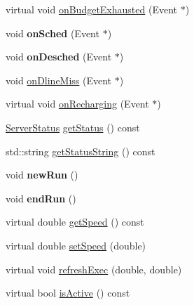 \begin{DoxyCompactItemize}
\item 
virtual void \hyperlink{classRTSim_1_1Server_aac96d1e7d21219fe4e31a49382579991}{on\+Budget\+Exhausted} (Event $\ast$)
\item 
void {\bfseries on\+Sched} (Event $\ast$)\hypertarget{classRTSim_1_1Server_a2aebdd0a2fcbbeec26896d33ad7e20fe}{}\label{classRTSim_1_1Server_a2aebdd0a2fcbbeec26896d33ad7e20fe}

\item 
void {\bfseries on\+Desched} (Event $\ast$)\hypertarget{classRTSim_1_1Server_a07abb53277721a0180be1705de77976e}{}\label{classRTSim_1_1Server_a07abb53277721a0180be1705de77976e}

\item 
void \hyperlink{classRTSim_1_1Server_aaea3cc79f262642af895aea0535a8343}{on\+Dline\+Miss} (Event $\ast$)
\item 
virtual void \hyperlink{classRTSim_1_1Server_a1953c2fe4181f52c9ef388e9dd3b477f}{on\+Recharging} (Event $\ast$)
\item 
\hyperlink{namespaceRTSim_a7b8699b4614a115fd4b5bedf6335ff7b}{Server\+Status} \hyperlink{classRTSim_1_1Server_aac5dc6ee4cc9b24aed3793d6bebcbef4}{get\+Status} () const 
\item 
std\+::string \hyperlink{classRTSim_1_1Server_a80c7082da1314a5ed5cef3cbfb6dbb10}{get\+Status\+String} () const 
\item 
void {\bfseries new\+Run} ()\hypertarget{classRTSim_1_1Server_ab5eee097079585c9f11bf3d11bbf5755}{}\label{classRTSim_1_1Server_ab5eee097079585c9f11bf3d11bbf5755}

\item 
void {\bfseries end\+Run} ()\hypertarget{classRTSim_1_1Server_ad85b3f1a41345e07a8bdf3523f7d214b}{}\label{classRTSim_1_1Server_ad85b3f1a41345e07a8bdf3523f7d214b}

\item 
virtual double \hyperlink{classRTSim_1_1Server_aca4be3f6360d6f88e26f3c10ff876970}{get\+Speed} () const 
\item 
virtual double \hyperlink{classRTSim_1_1Server_abf07ee6a2d5250b24bed30ff5f126d6b}{set\+Speed} (double)
\item 
virtual void \hyperlink{classRTSim_1_1Server_a2bd0687699ad2784928000801d8f2b47}{refresh\+Exec} (double, double)
\item 
virtual bool \hyperlink{classRTSim_1_1Server_ad229c3477f03bc4a041b5785b39447b1}{is\+Active} () const \hypertarget{classRTSim_1_1Server_ad229c3477f03bc4a041b5785b39447b1}{}\label{classRTSim_1_1Server_ad229c3477f03bc4a041b5785b39447b1}


\end{DoxyCompactItemize}
